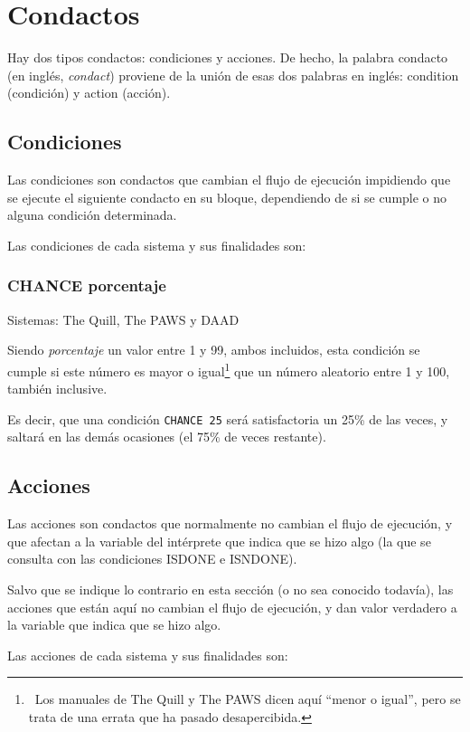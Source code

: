 \documentclass[11pt, a5paper]{article}
\newcommand{\quill}{\textsf{The Quill}\xspace}
\newcommand{\paw}{\textsf{The PAWS}\xspace}
\newcommand{\daad}{\textsf{DAAD}\xspace}
\newcommand{\sistemas}[1]{\noindent Sistemas: #1 \nopagebreak}
\begin{document}
\section{Condactos}

Hay dos tipos condactos: condiciones y acciones. De hecho, la palabra condacto (en inglés, \emph{condact}) proviene de la unión de esas dos palabras en inglés: condition (condición) y action (acción).

\subsection{Condiciones}

Las condiciones son condactos que cambian el flujo de ejecución impidiendo que se ejecute el siguiente condacto en su bloque, dependiendo de si se cumple o no alguna condición determinada.

Las condiciones de cada sistema y sus finalidades son:

\subsubsection{CHANCE porcentaje}

\sistemas{\quill, \paw y \daad}

Siendo \emph{porcentaje} un valor entre 1 y 99, ambos incluidos, esta condición se cumple si este número es mayor o igual\footnote{\ Los manuales de \quill y \paw dicen aquí ``menor o igual'', pero se trata de una errata que ha pasado desapercibida.} que un número aleatorio entre 1 y 100, también inclusive.

Es decir, que una condición \texttt{CHANCE 25} será satisfactoria un 25\% de las veces, y saltará en las demás ocasiones (el 75\% de veces restante).


\subsection{Acciones}

Las acciones son condactos que normalmente no cambian el flujo de ejecución, y que afectan a la variable del intérprete que indica que se hizo algo (la que se consulta con las condiciones ISDONE e ISNDONE).

Salvo que se indique lo contrario en esta sección (o no sea conocido todavía), las acciones que están aquí no cambian el flujo de ejecución, y dan valor verdadero a la variable que indica que se hizo algo.

Las acciones de cada sistema y sus finalidades son:
\end{document}
